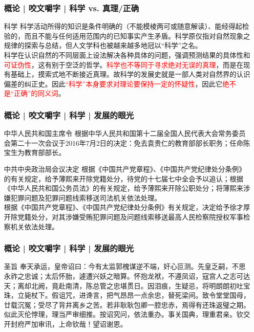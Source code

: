 \begin{frame}
  \frametitle{概论 | 咬文嚼字 | 科学 vs. 真理/正确}
  \begin{block}{科学}
科学活动所得的知识是条件明确的（不能模棱两可或随意解读）、能经得起检验的，而且不能与任何适用范围内的已知事实产生矛盾。科学原仅指对自然现象之规律的探索与总结，但人文学科也被越来越多地冠以“科学”之名。\\
    \vspace{1em}
科学在认识自然的不同层面上设法解决各种具体的问题，强调预测结果的具体性和\textcolor{red}{可证伪性}，这有别于空泛的哲学。\textcolor{red}{科学也不等同于寻求绝对无误的真理}，而是在现有基础上，摸索式地不断接近真理。故科学的发展史就是一部人类对自然界的认识偏差的纠正史。因此\textcolor{red}{“科学”本身要求对理论要保持一定的怀疑性}，因此它\textcolor{red}{绝不是“正确”的同义词}。
  \end{block}
\end{frame}

\begin{frame}
  \frametitle{概论 | 咬文嚼字 | 科学 | 发展的眼光}
  \begin{block}{中华人民共和国主席令}
根据中华人民共和国第十二届全国人民代表大会常务委员会第二十一次会议于2016年7月2日的决定：免去袁贵仁的教育部部长职务；任命陈宝生为教育部部长。
  \end{block}
  \begin{block}{中共中央政治局会议决定}
根据《中国共产党章程》、《中国共产党纪律处分条例》的有关规定，给予薄熙来开除党籍处分，待党的十七届七中全会予以追认；根据《中华人民共和国公务员法》的有关规定，给予薄熙来开除公职处分；将薄熙来涉嫌犯罪问题及犯罪问题线索移送司法机关依法处理。\\
\vspace{0.5em}
根据《中国共产党章程》、《中国共产党纪律处分条例》有关规定，决定给予徐才厚开除党籍处分，对其涉嫌受贿犯罪问题及问题线索移送最高人民检察院授权军事检察机关依法处理。
  \end{block}
\end{frame}

\begin{frame}
  \frametitle{概论 | 咬文嚼字 | 科学 | 发展的眼光}
  \begin{block}{圣旨}
奉天承运，皇帝诏曰：今有太监郭槐谋逆不端，奸心叵测。先皇乏嗣，不思永祚之忠诚；太后怀胎，遽遭兴妖之暗算。怀抱龙袱，不遵凤诏，寇宫人之志可达天；离却北阙，竟赴南清，陈总管之忠堪贯日。因泪痕，生疑忌，将明朗朗初吐宝珠，立毙杖下。假诅咒，进谗言，把气昂昂一点余忠，替死梁间。致令堂堂国母，廿载沉冤；受尽了背井离乡之苦。若非耿耿包卿一腔忠赤，焉得有还珠返璧之期。似此灭伦悖理，理当严审细推。按诏究问，依法重办。事关国典，理重君亲。钦交开封府严加审讯，上命钦哉！望诏谢恩。
  \end{block}
\end{frame}

